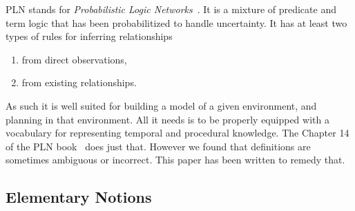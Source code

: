 \documentclass[runningheads]{llncs}
\begin{document}
PLN stands for \emph{Probabilistic Logic
  Networks}~\cite{Goertzel09PLN}.  It is a mixture of predicate and
term logic that has been probabilitized to handle uncertainty.  It has
at least two types of rules for inferring relationships
\begin{enumerate}
\item from direct observations,
\item from existing relationships.
\end{enumerate}
As such it is well suited for building a model of a given environment,
and planning in that environment.  All it needs is to be properly
equipped with a vocabulary for representing temporal and procedural
knowledge.  The Chapter 14 of the PLN book~\cite{Goertzel09PLN} does
just that.  However we found that definitions are sometimes ambiguous
or incorrect.  This paper has been written to remedy that.

\subsection{Elementary Notions}


%
%
%

\end{document}

